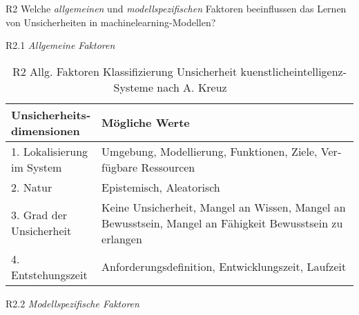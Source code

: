 \begin{otherlanguage}{ngerman}
R2 Welche \textit{allgemeinen} und \textit{modellspezifischen} Faktoren beeinflussen das Lernen von Unsicherheiten in \gls{machinelearning}-Modellen?

\newline
R2.1 \textit{Allgemeine Faktoren}

\begin{table}[!htpb]
  \centering
  \footnotesize
  \begin{tabularx}{\textwidth}{|l|X|}
    \hline
    \textbf{Unsicherheitsdimensionen} & \textbf{Mögliche Werte} \\
    \hline
    1. Lokalisierung im System & Umgebung, Modellierung, Funktionen, Ziele, Verfügbare Ressourcen \\
    \hline
    2. Natur & Epistemisch, Aleatorisch \\
    \hline
    3. Grad der Unsicherheit & Keine Unsicherheit, Mangel an Wissen, Mangel an Bewusstsein, Mangel an Fähigkeit Bewusstsein zu erlangen \\
    \hline
    4. Entstehungszeit & Anforderungsdefinition, Entwicklungszeit, Laufzeit \\
    \hline
  \end{tabularx}
  \caption{R2 Allg. Faktoren Klassifizierung Unsicherheit \gls{kuenstlicheintelligenz}-Systeme nach A. Kreuz ~\nocite{AndreasKreutz2022} ~\nocite{AndreasKreutz2022b}}
  \label{tab:chapter6r21}
\end{table}

\newline
R2.2 \textit{Modellspezifische Faktoren}


\end{otherlanguage}

